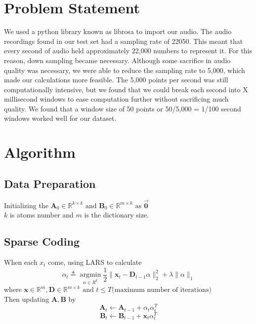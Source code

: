 \documentclass[UTF8]{article}
\begin{document}
\section{Problem Statement}
We used a python library known as librosa to import our audio\cite{valentini2017noisy}. The audio recordings found in our test set had a sampling rate of 22050. This meant that every second of audio held approximately 22,000 numbers to represent it. For this reason, down sampling became necessary. Although some sacrifice in audio quality was necessary, we were able to reduce the sampling rate to 5,000, which made our calculations more feasible. The 5,000 points per second was still computationally intensive, but we found that we could break each second into X millisecond windows to ease computation further without sacrificing much quality. We found that a window size of 50 points or 50/5,000 = 1/100 second windows worked well for our dataset.


\section{Algorithm}

\subsection{Data Preparation}

Initializing the $\bm{A}_0 \in \mathbb{R}^{k \times k} \text{ and } \bm{B}_0 \in \mathbb{R}^{m \times k} \text{ as } \vec{\bm{0}} $\\
$k$ is atoms number and $m$ is the dictionary size.

\subsection{Sparse Coding}
When each $x_t$ come, using LARS\cite{scikit-learn} to calculate
\[
	\alpha_t \triangleq \mathop{\arg\min}\limits_{\alpha\in R^k} \frac{1}{2} \| \bm{x}_t - \bm{D}_{t-1} \alpha  \|^2_2 + \lambda \|\alpha\|_1
\]
where $\bm{x} \in \mathbb{R}^{m}, \bm{D} \in \mathbb{R}^{m \times k} \text{ and } t \leq T \text{(maximum number of iterations)}$
\\
Then updating $\bm{A}, \bm{B}$ by
\[\bm{A}_t \leftarrow \bm{A}_{t-1} + \alpha_t \alpha_t^T\]
\[\bm{B}_t \leftarrow \bm{B}_{t-1} + \bm{x}_t \alpha_t^T\]
\end{document}
